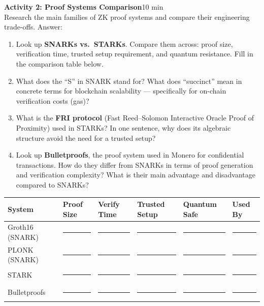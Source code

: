 \documentclass[11pt,a4paper]{article}
\newcommand{\activitybox}[3]{%
  \noindent\colorbox{mllavender4}{\parbox{\dimexpr\linewidth-2\fboxsep}{%
    \textbf{\color{mlpurple}#1}\hfill\textcolor{mlgray}{\small #2}\\[2pt]#3%
  }}\par\vspace{4pt}%
}
\newcommand{\fillcell}{\rule{2.2cm}{0.3pt}}
\begin{document}
\activitybox{Activity 2: Proof Systems Comparison}{10 min}{%
Research the main families of ZK proof systems and compare their engineering trade-offs. Answer:
\begin{enumerate}
\item Look up \textbf{SNARKs vs.\ STARKs}. Compare them across: proof size, verification time, trusted setup requirement, and quantum resistance. Fill in the comparison table below.
\item What does the ``S'' in SNARK stand for? What does ``succinct'' mean in concrete terms for blockchain scalability --- specifically for on-chain verification costs (gas)?
\item What is the \textbf{FRI protocol} (Fast Reed--Solomon Interactive Oracle Proof of Proximity) used in STARKs? In one sentence, why does its algebraic structure avoid the need for a trusted setup?
\item Look up \textbf{Bulletproofs}, the proof system used in Monero for confidential transactions. How do they differ from SNARKs in terms of proof generation and verification complexity? What is their main advantage and disadvantage compared to SNARKs?
\end{enumerate}
\vspace{4pt}
{\footnotesize\renewcommand{\arraystretch}{1.35}%
\setlength{\tabcolsep}{4pt}%
\begin{tabular}{@{}p{2.6cm}p{2.2cm}p{2.2cm}p{2.2cm}p{2.2cm}p{2.8cm}@{}}
\toprule
\textbf{System} & \textbf{Proof Size} & \textbf{Verify Time} & \textbf{Trusted Setup} & \textbf{Quantum Safe} & \textbf{Used By} \\
\midrule
Groth16 (SNARK) & \fillcell & \fillcell & \fillcell & \fillcell & \fillcell \\
PLONK (SNARK)   & \fillcell & \fillcell & \fillcell & \fillcell & \fillcell \\
STARK           & \fillcell & \fillcell & \fillcell & \fillcell & \fillcell \\
Bulletproofs    & \fillcell & \fillcell & \fillcell & \fillcell & \fillcell \\
\bottomrule
\end{tabular}}
\vspace{2pt}
}

\vspace{2pt}
\end{document}
